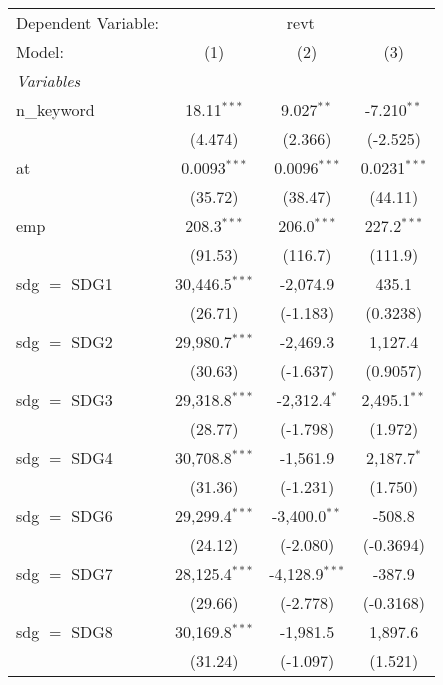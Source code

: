 
\begingroup
\centering
\begin{tabular}{lccc}
   \tabularnewline \midrule \midrule
   Dependent Variable: & \multicolumn{3}{c}{revt}\\
   Model:        & (1)              & (2)              & (3)\\  
   \midrule
   \emph{Variables}\\
   n\_keyword    & 18.11$^{***}$    & 9.027$^{**}$     & -7.210$^{**}$\\   
                 & (4.474)          & (2.366)          & (-2.525)\\   
   at            & 0.0093$^{***}$   & 0.0096$^{***}$   & 0.0231$^{***}$\\   
                 & (35.72)          & (38.47)          & (44.11)\\   
   emp           & 208.3$^{***}$    & 206.0$^{***}$    & 227.2$^{***}$\\   
                 & (91.53)          & (116.7)          & (111.9)\\   
   sdg $=$ SDG1  & 30,446.5$^{***}$ & -2,074.9         & 435.1\\   
                 & (26.71)          & (-1.183)         & (0.3238)\\   
   sdg $=$ SDG2  & 29,980.7$^{***}$ & -2,469.3         & 1,127.4\\   
                 & (30.63)          & (-1.637)         & (0.9057)\\   
   sdg $=$ SDG3  & 29,318.8$^{***}$ & -2,312.4$^{*}$   & 2,495.1$^{**}$\\   
                 & (28.77)          & (-1.798)         & (1.972)\\   
   sdg $=$ SDG4  & 30,708.8$^{***}$ & -1,561.9         & 2,187.7$^{*}$\\   
                 & (31.36)          & (-1.231)         & (1.750)\\   
   sdg $=$ SDG6  & 29,299.4$^{***}$ & -3,400.0$^{**}$  & -508.8\\   
                 & (24.12)          & (-2.080)         & (-0.3694)\\   
   sdg $=$ SDG7  & 28,125.4$^{***}$ & -4,128.9$^{***}$ & -387.9\\   
                 & (29.66)          & (-2.778)         & (-0.3168)\\   
   sdg $=$ SDG8  & 30,169.8$^{***}$ & -1,981.5         & 1,897.6\\   
                 & (31.24)          & (-1.097)         & (1.521)\\   

\end{tabular}
